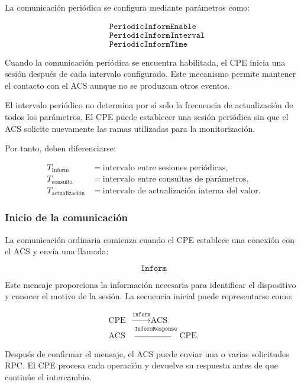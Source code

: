 La comunicación periódica se configura mediante parámetros como:

\[
\begin{aligned}
    &\texttt{PeriodicInformEnable}\\
    &\texttt{PeriodicInformInterval}\\
    &\texttt{PeriodicInformTime}
\end{aligned}
\]

Cuando la comunicación periódica se encuentra habilitada, el CPE inicia
una sesión después de cada intervalo configurado. Este mecanismo permite
mantener el contacto con el ACS aunque no se produzcan otros eventos.

El intervalo periódico no determina por sí solo la frecuencia de
actualización de todos los parámetros. El CPE puede establecer una sesión
periódica sin que el ACS solicite nuevamente las ramas utilizadas para la
monitorización.

Por tanto, deben diferenciarse:

\[
\begin{aligned}
    T_{\mathrm{Inform}}
    &=
    \text{intervalo entre sesiones periódicas},\\
    T_{\mathrm{consulta}}
    &=
    \text{intervalo entre consultas de parámetros},\\
    T_{\mathrm{actualización}}
    &=
    \text{intervalo de actualización interna del valor}.
\end{aligned}
\]


\subsubsection*{Inicio de la comunicación}

La comunicación ordinaria comienza cuando el CPE establece una conexión
con el ACS y envía una llamada:

\[
    \texttt{Inform}
\]

Este mensaje proporciona la información necesaria para identificar el
dispositivo y conocer el motivo de la sesión. La secuencia inicial puede
representarse como:

\[
\begin{aligned}
    \text{CPE}
    &\xrightarrow{\texttt{Inform}}
    \text{ACS}\\
    \text{ACS}
    &\xrightarrow{\texttt{InformResponse}}
    \text{CPE}.
\end{aligned}
\]

Después de confirmar el mensaje, el ACS puede enviar una o varias
solicitudes RPC. El CPE procesa cada operación y devuelve su respuesta
antes de que continúe el intercambio.

